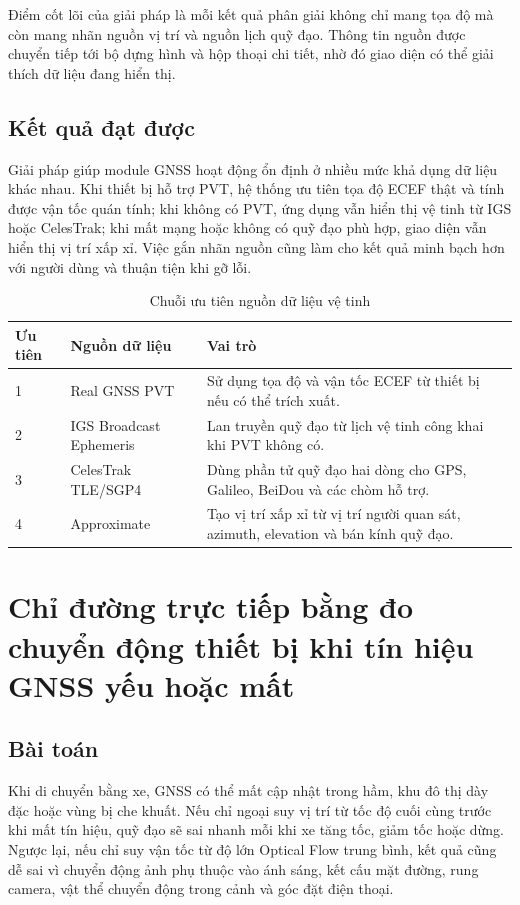 \documentclass[../DoAn.tex]{subfiles}
\begin{document}
Điểm cốt lõi của giải pháp là mỗi kết quả phân giải không chỉ mang tọa độ mà còn mang nhãn nguồn vị trí và nguồn lịch quỹ đạo. Thông tin nguồn được chuyển tiếp tới bộ dựng hình và hộp thoại chi tiết, nhờ đó giao diện có thể giải thích dữ liệu đang hiển thị.

\subsection{Kết quả đạt được}
Giải pháp giúp module GNSS hoạt động ổn định ở nhiều mức khả dụng dữ liệu khác nhau. Khi thiết bị hỗ trợ PVT, hệ thống ưu tiên tọa độ ECEF thật và tính được vận tốc quán tính; khi không có PVT, ứng dụng vẫn hiển thị vệ tinh từ IGS hoặc CelesTrak; khi mất mạng hoặc không có quỹ đạo phù hợp, giao diện vẫn hiển thị vị trí xấp xỉ. Việc gắn nhãn nguồn cũng làm cho kết quả minh bạch hơn với người dùng và thuận tiện khi gỡ lỗi.

\begin{table}[H]
\centering
\begin{tabular}{|p{2.2cm}|p{4.3cm}|p{6.4cm}|}
\hline
\textbf{Ưu tiên} & \textbf{Nguồn dữ liệu} & \textbf{Vai trò} \\ \hline
1 & Real GNSS PVT & Sử dụng tọa độ và vận tốc ECEF từ thiết bị nếu có thể trích xuất. \\ \hline
2 & IGS Broadcast Ephemeris & Lan truyền quỹ đạo từ lịch vệ tinh công khai khi PVT không có. \\ \hline
3 & CelesTrak TLE/SGP4 & Dùng phần tử quỹ đạo hai dòng cho GPS, Galileo, BeiDou và các chòm hỗ trợ. \\ \hline
4 & Approximate & Tạo vị trí xấp xỉ từ vị trí người quan sát, azimuth, elevation và bán kính quỹ đạo. \\ \hline
\end{tabular}
\caption{Chuỗi ưu tiên nguồn dữ liệu vệ tinh}
\label{table:gnss-source-priority}
\end{table}

\section{Chỉ đường trực tiếp bằng đo chuyển động thiết bị khi tín hiệu GNSS yếu hoặc mất}
\label{section:5.live-routing-fusion}
\subsection{Bài toán}
Khi di chuyển bằng xe, GNSS có thể mất cập nhật trong hầm, khu đô thị dày đặc hoặc vùng bị che khuất. Nếu chỉ ngoại suy vị trí từ tốc độ cuối cùng trước khi mất tín hiệu, quỹ đạo sẽ sai nhanh mỗi khi xe tăng tốc, giảm tốc hoặc dừng. Ngược lại, nếu chỉ suy vận tốc từ độ lớn Optical Flow trung bình, kết quả cũng dễ sai vì chuyển động ảnh phụ thuộc vào ánh sáng, kết cấu mặt đường, rung camera, vật thể chuyển động trong cảnh và góc đặt điện thoại.
\end{document}
